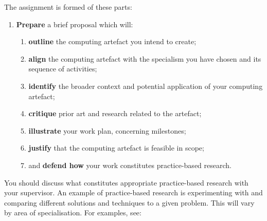 \documentclass{../../fal_assignment}
\begin{document}
The assignment is formed of these parts:

\begin{enumerate}[label=(\Alph*)]
	\item \textbf{Prepare} a brief proposal which will:
		\begin{enumerate}[label=(\roman*)]
			\item \textbf{outline} the computing artefact you intend to create;
			\item \textbf{align} the computing artefact with the specialism you have chosen and its sequence of activities;
			\item \textbf{identify} the broader context and potential application of your computing artefact;
			\item \textbf{critique} prior art and research related to the artefact;
			\item \textbf{illustrate} your work plan, concerning milestones;
			\item \textbf{justify} that the computing artefact is feasible in scope;
			\item and \textbf{defend how} your work constitutes practice-based research. 
		\end{enumerate}
\end{enumerate}

You should discuss what constitutes appropriate practice-based research with your supervisor. An example of practice-based research is experimenting with and comparing different solutions and techniques to a given problem. This will vary by area of specialisation. For examples, see:
\end{document}

